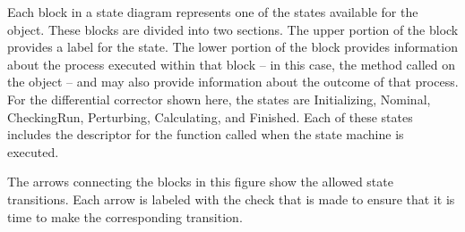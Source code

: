 Each block in a state diagram represents one of the states available for the object.  These blocks
are divided into two sections.  The upper portion of the block provides a label for the state.  The
lower portion of the block provides information about the process executed within that block -- in
this case, the method called on the object -- and may also provide information about the outcome of
that process.  For the differential corrector shown here, the states are Initializing, Nominal,
CheckingRun, Perturbing, Calculating, and Finished.  Each of these states includes the descriptor
for the function called when the state machine is executed.

The arrows connecting the blocks in this figure show the allowed state transitions.  Each arrow is
labeled with the check that is made to ensure that it is time to make the corresponding transition.
